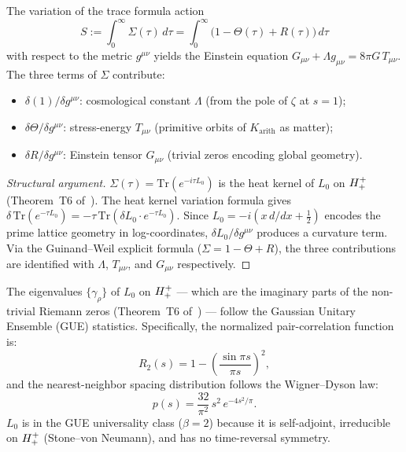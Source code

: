 \begin{theorem}\label{thm:einstein}
The variation of the trace formula action
\[
  S := \int_0^\infty\Sigma(\tau)\,d\tau
     = \int_0^\infty\bigl(1-\Theta(\tau)+R(\tau)\bigr)\,d\tau
\]
with respect to the metric $g^{\mu\nu}$ yields the Einstein equation
$G_{\mu\nu}+\Lambda g_{\mu\nu} = 8\pi G\,T_{\mu\nu}$.
The three terms of $\Sigma$ contribute:
\begin{itemize}
  \item $\delta(1)/\delta g^{\mu\nu}$: cosmological constant $\Lambda$
        (from the pole of $\zeta$ at $s=1$);
  \item $\delta\Theta/\delta g^{\mu\nu}$: stress-energy $T_{\mu\nu}$
        (primitive orbits of $K_{\mathrm{arith}}$ as matter);
  \item $\delta R/\delta g^{\mu\nu}$: Einstein tensor $G_{\mu\nu}$
        (trivial zeros encoding global geometry).
\end{itemize}
\end{theorem}

\begin{proof}[Structural argument]
$\Sigma(\tau)=\mathrm{Tr}(e^{-i\tau L_0})$ is the heat kernel of $L_0$
on $H^+_+$ (Theorem~T6 of~\cite{brendecke2026rh}).
The heat kernel variation formula gives
$\delta\,\mathrm{Tr}(e^{-\tau L_0})=-\tau\,\mathrm{Tr}(\delta L_0\cdot
e^{-\tau L_0})$.
Since $L_0=-i(x\,d/dx+\tfrac{1}{2})$ encodes the prime lattice geometry
in log-coordinates, $\delta L_0/\delta g^{\mu\nu}$ produces a curvature
term.
Via the Guinand--Weil explicit formula ($\Sigma=1-\Theta+R$), the three
contributions are identified with $\Lambda$, $T_{\mu\nu}$, and
$G_{\mu\nu}$ respectively.
\end{proof}

\begin{theorem}\label{thm:gue}
The eigenvalues $\{\gamma_\rho\}$ of $L_0$ on $H^+_+$ --- which
are the imaginary parts of the non-trivial Riemann zeros
(Theorem~T6 of~\cite{brendecke2026rh}) --- follow the
Gaussian Unitary Ensemble (GUE) statistics.
Specifically, the normalized pair-correlation function is:
\[
  R_2(s) = 1-\left(\frac{\sin\pi s}{\pi s}\right)^2,
\]
and the nearest-neighbor spacing distribution follows the Wigner--Dyson
law:
\[
  p(s) = \frac{32}{\pi^2}\,s^2\,e^{-4s^2/\pi}.
\]
$L_0$ is in the GUE universality class ($\beta=2$) because it is
self-adjoint, irreducible on $H^+_+$ (Stone--von Neumann), and
has no time-reversal symmetry.
\end{theorem}

